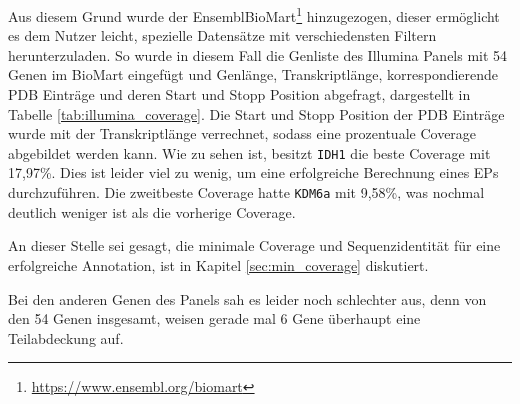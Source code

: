 Aus diesem Grund wurde der EnsemblBioMart\footnote{\url{https://www.ensembl.org/biomart}} hinzugezogen, dieser ermöglicht es dem Nutzer leicht, spezielle Datensätze mit verschiedensten Filtern herunterzuladen. So wurde in diesem Fall die Genliste des Illumina Panels mit 54 Genen im BioMart eingefügt und Genlänge, Transkriptlänge, korrespondierende \ac{PDB} Einträge und deren Start und Stopp Position abgefragt, dargestellt in Tabelle \ref{tab:illumina_coverage}. Die Start und Stopp Position der \ac{PDB} Einträge wurde mit der Transkriptlänge verrechnet, sodass eine prozentuale Coverage abgebildet werden kann. Wie zu sehen ist, besitzt \texttt{IDH1} die beste Coverage mit 17,97\%. Dies ist leider viel zu wenig, um eine erfolgreiche Berechnung eines \ac{EP}s durchzuführen. Die zweitbeste Coverage hatte \texttt{KDM6a} mit 9,58\%, was nochmal deutlich weniger ist als die vorherige Coverage.

An dieser Stelle sei gesagt, die minimale Coverage und Sequenzidentität für eine erfolgreiche Annotation, ist in Kapitel \ref{sec:min_coverage} diskutiert. 

Bei den anderen Genen des Panels sah es leider noch schlechter aus, denn von den 54 Genen insgesamt, weisen gerade mal 6 Gene überhaupt eine Teilabdeckung auf.

\begin{table}[]
    \centering
    \caption{VariantPlex Solid Tumor Kit Coverage, Transkriptlänge ist mit UTRs und CDS angegeben.}
    \label{tab:variantplex_coverage}
\end{table}

